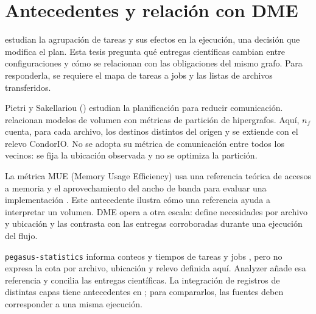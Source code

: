 \section{Antecedentes y relación con DME}
\citet{chen2015} estudian la agrupación de tareas y sus efectos en la ejecución, una decisión que modifica el plan. Esta tesis pregunta qué entregas científicas cambian entre configuraciones y cómo se relacionan con las obligaciones del mismo grafo. Para responderla, se requiere el mapa de tareas a jobs y las listas de archivos transferidos.

Pietri y Sakellariou (\citeyear{pietri2018}) estudian la planificación para reducir comunicación. \citet{fortmeier2013} relacionan modelos de volumen con métricas de partición de hipergrafos. Aquí, $n_f$ cuenta, para cada archivo, los destinos distintos del origen y se extiende con el relevo CondorIO. No se adopta su métrica de comunicación entre todos los vecinos: se fija la ubicación observada y no se optimiza la partición.

La métrica MUE (Memory Usage Efficiency) usa una referencia teórica de accesos a memoria y el aprovechamiento del ancho de banda para evaluar una implementación \citep{fuhrer2018}. Este antecedente ilustra cómo una referencia ayuda a interpretar un volumen. DME opera a otra escala: define necesidades por archivo y ubicación y las contrasta con las entregas corroboradas durante una ejecución del flujo.

\texttt{pegasus-statistics} informa conteos y tiempos de tareas y jobs \citep{pegasusstats}, pero no expresa la cota por archivo, ubicación y relevo definida aquí. Analyzer añade esa referencia y concilia las entregas científicas. La integración de registros de distintas capas tiene antecedentes en \citet{papadimitriou2021}; para compararlos, las fuentes deben corresponder a una misma ejecución.


